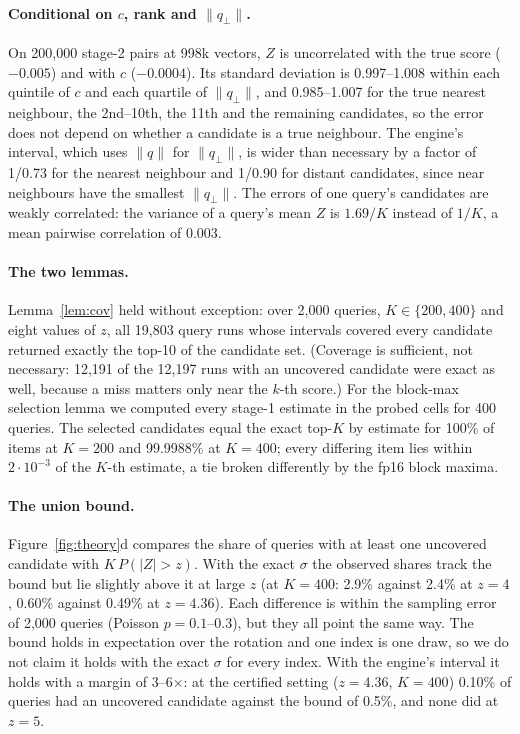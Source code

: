 \documentclass[10pt]{article}
\begin{document}
\paragraph{Conditional on $c$, rank and $\|q_\perp\|$.} On 200{,}000 stage-2 pairs at 998k vectors, $Z$ is uncorrelated with the true score ($-0.005$) and with $c$ ($-0.0004$). Its standard deviation is 0.997--1.008 within each quintile of $c$ and each quartile of $\|q_\perp\|$, and 0.985--1.007 for the true nearest neighbour, the 2nd--10th, the 11th and the remaining candidates, so the error does not depend on whether a candidate is a true neighbour. The engine's interval, which uses $\|q\|$ for $\|q_\perp\|$, is wider than necessary by a factor of 1/0.73 for the nearest neighbour and 1/0.90 for distant candidates, since near neighbours have the smallest $\|q_\perp\|$. The errors of one query's candidates are weakly correlated: the variance of a query's mean $Z$ is $1.69/K$ instead of $1/K$, a mean pairwise correlation of 0.003.

\paragraph{The two lemmas.} Lemma~\ref{lem:cov} held without exception: over 2{,}000 queries, $K\in\{200,400\}$ and eight values of $z$, all 19{,}803 query runs whose intervals covered every candidate returned exactly the top-10 of the candidate set. (Coverage is sufficient, not necessary: 12{,}191 of the 12{,}197 runs with an uncovered candidate were exact as well, because a miss matters only near the $k$-th score.) For the block-max selection lemma we computed every stage-1 estimate in the probed cells for 400 queries. The selected candidates equal the exact top-$K$ by estimate for 100\% of items at $K=200$ and 99.9988\% at $K=400$; every differing item lies within $2\cdot10^{-3}$ of the $K$-th estimate, a tie broken differently by the fp16 block maxima.

\paragraph{The union bound.} Figure~\ref{fig:theory}d compares the share of queries with at least one uncovered candidate with $K\,P(|Z|>z)$. With the exact $\sigma$ the observed shares track the bound but lie slightly above it at large $z$ (at $K=400$: 2.9\% against 2.4\% at $z=4$, 0.60\% against 0.49\% at $z=4.36$). Each difference is within the sampling error of 2{,}000 queries (Poisson $p=0.1$--0.3), but they all point the same way. The bound holds in expectation over the rotation and one index is one draw, so we do not claim it holds with the exact $\sigma$ for every index. With the engine's interval it holds with a margin of 3--6$\times$: at the certified setting ($z=4.36$, $K=400$) 0.10\% of queries had an uncovered candidate against the bound of 0.5\%, and none did at $z=5$.
\end{document}
